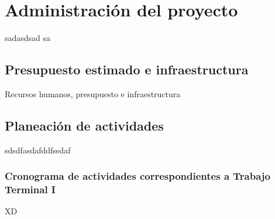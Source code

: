 \section{Administración del proyecto}
\label{Presupuesto destinado}
sadasdsad
sa
\\

\subsection{Presupuesto estimado e infraestructura}
Recursos humanos, presupuesto e infraestructura\\

\subsection{Planeación de actividades}
sdsdfasdafddfssdaf

\newpage
\subsubsection{Cronograma de actividades correspondientes a Trabajo Terminal I}

XD

